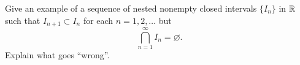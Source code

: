 \begin{exercise}
  \label{ex:hw02:nested-closed-intervals}
  Give an example of a sequence of nested nonempty closed intervals
  $\{I_n\}$ in $\mathbb{R}$ such that $I_{n+1}\subset I_n$ for each
  $n=1,2,\ldots$ but
  \[
    \bigcap_{n=1}^{\infty} I_n=\varnothing.
  \]
  Explain what goes ``wrong''.
\end{exercise}
